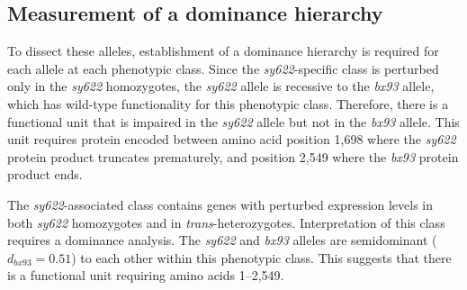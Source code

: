 \documentclass[10pt, twocolumn]{article}
\begin{document}
\subsection*{Measurement of a dominance hierarchy}

To dissect these alleles, establishment of a dominance hierarchy is required for
each allele at each phenotypic class. Since the \emph{sy622}-specific class is
perturbed only in the \emph{sy622} homozygotes, the \emph{sy622} allele is
recessive to the \emph{bx93} allele, which has wild-type functionality for this
phenotypic class. Therefore, there is a functional unit that is impaired in the
\emph{sy622} allele but not in the \emph{bx93} allele. This unit requires
protein encoded between amino acid position 1,698 where the \emph{sy622} protein
product truncates prematurely, and position 2,549 where the \emph{bx93} protein
product ends.

The \emph{sy622}-associated class contains genes with perturbed expression
levels in both \emph{sy622} homozygotes and in \emph{trans}-heterozygotes.
Interpretation of this class requires a dominance analysis. The \emph{sy622} and
\emph{bx93} alleles are semidominant ($d_{bx93} = 0.51$) to each other within
this phenotypic class. This suggests that there is a functional unit requiring
amino acids 1--2,549.
\end{document}
